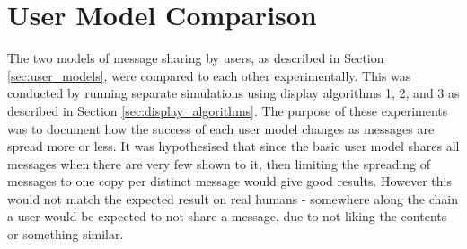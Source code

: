 \documentclass[bsc,frontabs,twoside,singlespacing,parskip,deptreport]{infthesis}     %
\begin{document}
\section{User Model Comparison} \label{sec:user_model_comparison}
The two models of message sharing by users, as described in Section \ref{sec:user_models}, were compared to each other experimentally. This was conducted by running separate simulations using display algorithms 1, 2, and 3 as described in Section \ref{sec:display_algorithms}. The purpose of these experiments was to document how the success of each user model changes as messages are spread more or less. It was hypothesised that since the basic user model shares all messages when there are very few shown to it, then limiting the spreading of messages to one copy per distinct message would give good results. However this would not match the expected result on real humans - somewhere along the chain a user would be expected to not share a message, due to not liking the contents or something similar.
\end{document}
